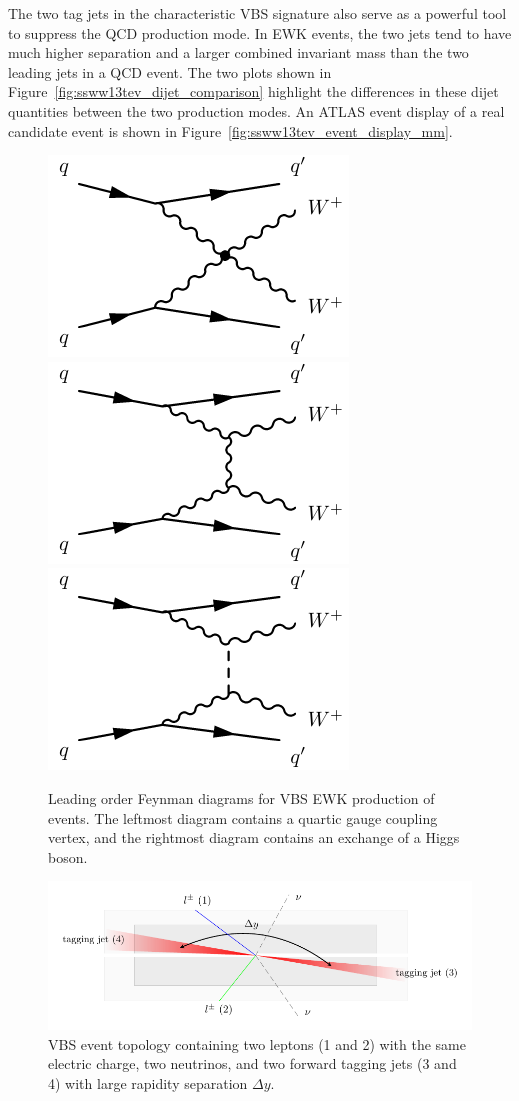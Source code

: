The two tag jets in the characteristic VBS signature also serve as a powerful tool to suppress the QCD production mode.
In EWK events, the two jets tend to have much higher separation and a larger combined invariant mass than the two leading jets in a QCD event.
The two plots shown in Figure~\ref{fig:ssww13tev_dijet_comparison} highlight the differences in these dijet quantities between the two production modes.
An ATLAS event display of a real \ssww candidate event is shown in Figure~\ref{fig:ssww13tev_event_display_mm}.

\begin{figure}[htbp]
  \centering
  \includegraphics[width=.32\textwidth]{figs/ssww_13tev/diagrams/vbs1}
  \includegraphics[width=.32\textwidth]{figs/ssww_13tev/diagrams/vbs2}
  \includegraphics[width=.32\textwidth]{figs/ssww_13tev/diagrams/vbs3}
  \caption{Leading order Feynman diagrams for VBS EWK production of \ssww events. The leftmost diagram contains a quartic gauge coupling vertex, and the rightmost diagram contains an exchange of a Higgs boson.}
  \label{fig:ssww13tev_diagrams_vbs_ssww}
\end{figure}

\begin{figure}[htbp]
  \centering
  \includegraphics[width=.95\textwidth]{figs/ssww_13tev/introduction/vbs_event_topology}
  \caption{\ssww VBS event topology containing two leptons (1 and 2) with the same electric charge, two neutrinos, and two forward tagging jets (3 and 4) with large rapidity separation $\Delta y$.}
  \label{fig:ssww13tev_event_topology}
\end{figure}

